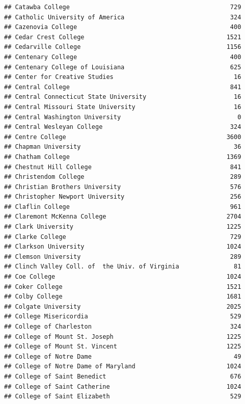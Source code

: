 \documentclass[
]{article}
\begin{document}
\begin{verbatim}
## Catawba College                                            729
## Catholic University of America                             324
## Cazenovia College                                          400
## Cedar Crest College                                       1521
## Cedarville College                                        1156
## Centenary College                                          400
## Centenary College of Louisiana                             625
## Center for Creative Studies                                 16
## Central College                                            841
## Central Connecticut State University                        16
## Central Missouri State University                           16
## Central Washington University                                0
## Central Wesleyan College                                   324
## Centre College                                            3600
## Chapman University                                          36
## Chatham College                                           1369
## Chestnut Hill College                                      841
## Christendom College                                        289
## Christian Brothers University                              576
## Christopher Newport University                             256
## Claflin College                                            961
## Claremont McKenna College                                 2704
## Clark University                                          1225
## Clarke College                                             729
## Clarkson University                                       1024
## Clemson University                                         289
## Clinch Valley Coll. of  the Univ. of Virginia               81
## Coe College                                               1024
## Coker College                                             1521
## Colby College                                             1681
## Colgate University                                        2025
## College Misericordia                                       529
## College of Charleston                                      324
## College of Mount St. Joseph                               1225
## College of Mount St. Vincent                              1225
## College of Notre Dame                                       49
## College of Notre Dame of Maryland                         1024
## College of Saint Benedict                                  676
## College of Saint Catherine                                1024
## College of Saint Elizabeth                                 529

\end{verbatim}
\end{document}
